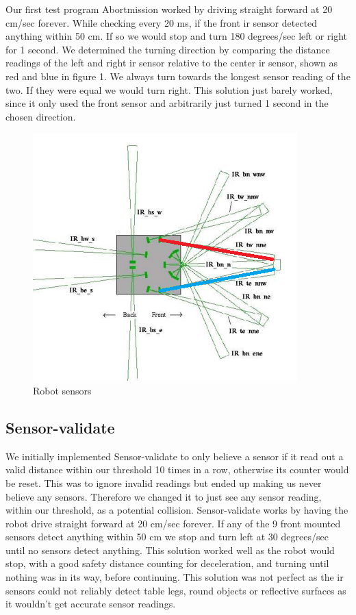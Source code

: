 \documentclass[a4paper,12pt]{article}
\begin{document}
Our first test program Abortmission worked by driving straight forward at 20 cm/sec forever. While checking every 20 ms, if the front ir sensor detected anything within 50 cm. If so we would stop and turn 180 degrees/sec left or right for 1 second. We determined the turning direction by comparing the distance readings of the left and right ir sensor relative to the center ir sensor, shown as red and blue in figure 1. We always turn towards the longest sensor reading of the two. If they were equal we would turn right.
\newline
\newline
This solution just barely worked, since it only used the front sensor and arbitrarily just turned 1 second in the chosen direction.

\begin{figure}[!h]
\centering
\includegraphics[scale=0.7]{robot2.png}
\caption{Robot sensors}
\end{figure}
\subsection{Sensor-validate}

We initially implemented Sensor-validate to only believe a sensor if it read out a valid distance within our threshold 10 times in a row, otherwise its counter would be reset. This was to ignore invalid readings but ended up making us never believe any sensors. Therefore we changed it to just see any sensor reading, within our threshold, as a potential collision.
\newline
\newline
Sensor-validate works by having the robot drive straight forward at 20 cm/sec forever. If any of the 9 front mounted sensors detect anything within 50 cm we stop and turn left at 30 degrees/sec until no sensors detect anything. 
\newline
\newline
This solution worked well as the robot would stop, with a good safety distance counting for deceleration, and turning until nothing was in its way, before continuing. This solution was not perfect as the ir sensors could not reliably detect table legs, round objects or reflective surfaces as it wouldn't get accurate sensor readings.
\end{document}
